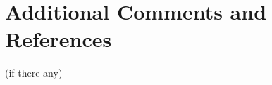 \documentclass[12pt]{article}
\begin{document}

\section{Additional Comments and References}

    (if there any)
\end{document}
